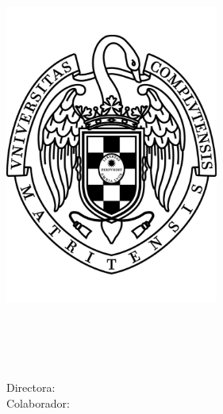 
\begin{titlepage}

\begin{addmargin}[-1cm]{-3cm}
\begin{center}
\large

\hfill
\vfill

\begingroup
\color{Maroon} \\
\color{Maroon} \\
\bigskip %
\endgroup

\spacedlowsmallcaps{\myName} %

\vfill

\includegraphics[width=7cm]{Imagenes/escudoUCM} \\ \medskip %


\newcommand{\myTitle}{\xspace}

\mySubtitle \\ \medskip %
\myDegree \\
\myFaculty \\
\myUni \\ 
Directora: \myProf \\
Colaborador: \myOtherProf \\
\bigskip

\myTime

\vfill

\end{center}
\end{addmargin}

\end{titlepage}